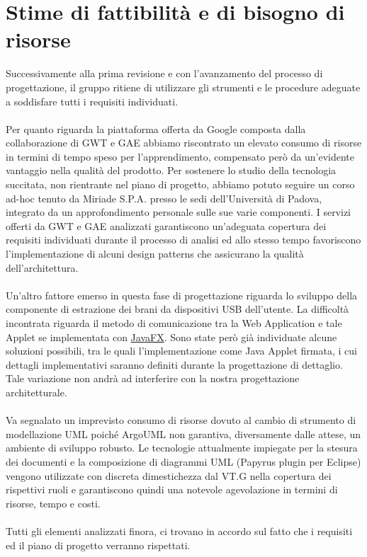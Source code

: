 \chapter{Stime di fattibilit\`a e di bisogno di risorse}
\thispagestyle{fancy}

Successivamente alla prima revisione e con l'avanzamento del processo di
progettazione, il gruppo ritiene di utilizzare gli strumenti e le procedure
adeguate a soddisfare tutti i requisiti individuati.
\\\\
Per quanto riguarda la piattaforma offerta da Google composta dalla
collaborazione di GWT e GAE abbiamo riscontrato un elevato consumo di risorse in
termini di tempo speso per l'apprendimento, compensato per\`o da un'evidente
vantaggio nella qualit\`a del prodotto. Per sostenere lo studio della tecnologia
succitata, non rientrante nel piano di progetto, abbiamo potuto seguire un corso
ad-hoc tenuto da Miriade S.P.A. presso le sedi dell'Universit\`a di Padova,
integrato da un approfondimento personale sulle sue varie componenti. I servizi
offerti da GWT e GAE analizzati garantiscono un'adeguata copertura dei
requisiti individuati durante il processo di analisi ed allo stesso tempo favoriscono
l'implementazione di alcuni design patterns che assicurano la qualit\`a
dell'architettura.
\\\\
Un'altro fattore emerso in questa fase di progettazione riguarda lo sviluppo
della componente di estrazione dei brani da dispositivi USB dell'utente. La
difficolt\`a incontrata riguarda il metodo di comunicazione tra la Web
Application e tale Applet se implementata con \underline{JavaFX}. Sono state
per\`o gi\`a individuate alcune soluzioni possibili, tra le quali
l'implementazione come Java Applet firmata, i cui dettagli implementativi saranno definiti durante la
progettazione di dettaglio. Tale variazione non andr\`a ad interferire con la
nostra progettazione architetturale.
\\\\
Va segnalato un imprevisto consumo di risorse dovuto al cambio di strumento di
modellazione UML poich\'e ArgoUML non garantiva, diversamente dalle attese, un
ambiente di sviluppo robusto. Le tecnologie attualmente impiegate per la stesura
dei documenti e la composizione di diagrammi UML (Papyrus plugin per Eclipse)
vengono utilizzate con discreta dimestichezza dal VT.G nella copertura dei
rispettivi ruoli e garantiscono quindi una notevole agevolazione in termini di
risorse, tempo e costi.
\\\\
Tutti gli elementi analizzati finora, ci trovano in accordo sul fatto che i
requisiti ed il piano di progetto verranno rispettati.

\listoftables
{}
\listoffigures
{}

